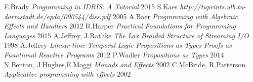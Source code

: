 \documentclass[11pt,oneside]{article}
\begin{document}
\begin{thebibliography}{9}
    E.Brady \textit{Programming in IDRIS: A Tutorial} 2015
     S.Kaes \textit{http://tuprints.ulb.tu-darmstadt.de/epda/000544/diss.pdf} 2005
     A.Baer \textit{Programming with Algebraic Effects and Handlers} 2012
    R.Harper \textit{Practical Foundations for Programming Languages} 2015
   A.Jeffrey, J.Rathke \textit{The Lax Braided Structure of Streaming I/O} 1998
     A.Jeffrey \textit{Linear-time Temporal Logic Propositions as Types Proofs as Functional Reactive Programs} 2012
   P.Wadler \textit{Propositions as Types} 2014
       N.Benton, J.Hughes,E.Moggi \textit{Monads and Effects} 2002
   C.McBride, R.Patterson. \textit{Applicative programming with effects} 2002

\end{thebibliography}
\end{document}

